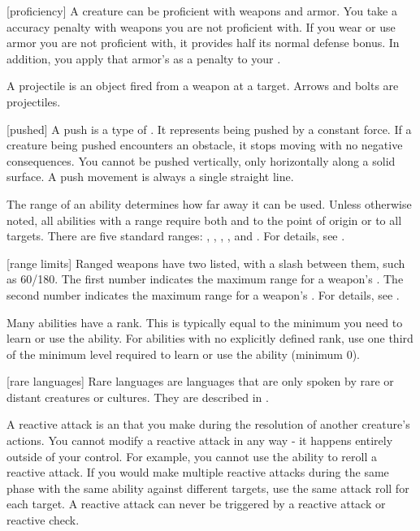 [proficiency] A creature can be proficient with weapons and armor.
You take a  accuracy penalty with weapons you are not proficient with.
If you wear or use armor you are not proficient with, it provides half its normal defense bonus.
In addition, you apply that armor's  as a penalty to your .

 A projectile is an object fired from a weapon at a target.
Arrows and bolts are projectiles.

[pushed] A push is a type of .
It represents being pushed by a constant force.
If a creature being pushed encounters an obstacle, it stops moving with no negative consequences.
You cannot be pushed vertically, only horizontally along a solid surface.
A push movement is always a single straight line.

 The range of an ability determines how far away it can be used.
Unless otherwise noted, all abilities with a range require both  and  to the point of origin or to all targets.
There are five standard ranges: \shortrange, \medrange, \longrange, \distrange, and \extrange.
For details, see .

[range limits] Ranged weapons have two  listed, with a slash between them, such as 60/180.
The first number indicates the maximum range for a weapon's .
The second number indicates the maximum range for a weapon's .
For details, see .

 Many abilities have a rank.
This is typically equal to the minimum  you need to learn or use the ability.
For abilities with no explicitly defined rank, use one third of the minimum level required to learn or use the ability (minimum 0).

[rare languages] Rare languages are languages that are only spoken by rare or distant creatures or cultures.
They are described in .

 A reactive attack is an  that you make during the resolution of another creature's actions.
You cannot modify a reactive attack in any way - it happens entirely outside of your control.
For example, you cannot use the  ability to reroll a reactive attack.
If you would make multiple reactive attacks during the same phase with the same ability against different targets, use the same attack roll for each target.
A reactive attack can never be triggered by a reactive attack or reactive check.

